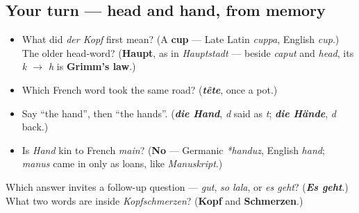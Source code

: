 \subsection*{Your turn — head and hand, from memory}
\begin{itemize}
\raggedright
  \item What did \emph{der Kopf} first mean? (A \textbf{cup} — Late Latin \emph{cuppa}, English \emph{cup}.) The older head-word? (\textbf{Haupt}, as in \emph{Hauptstadt} — beside \emph{caput} and \emph{head}, its \emph{k $\to$ h} is \textbf{Grimm's law}.)
  \item Which French word took the same road? (\emph{\textbf{tête}}, once a pot.)
  \item Say \textquotedblleft{}the hand\textquotedblright{}, then \textquotedblleft{}the hands\textquotedblright{}. (\emph{\textbf{die Hand}}, \emph{d} said as \emph{t}; \emph{\textbf{die Hände}}, \emph{d} back.)
  \item Is \emph{Hand} kin to French \emph{main}? (\textbf{No} — Germanic \emph{*handuz}, English \emph{hand}; \emph{manus} came in only as loans, like \emph{Manuskript}.)
\end{itemize}

\begin{tcolorbox}[breakable,colback=teal!4,colframe=teal!35!black,title={Before you move on}]
Which answer invites a follow-up question — \emph{gut}, \emph{so lala}, or \emph{es geht}? (\emph{\textbf{Es geht}}.) What two words are inside \emph{Kopfschmerzen}? (\textbf{Kopf} and \textbf{Schmerzen}.)
\end{tcolorbox}
